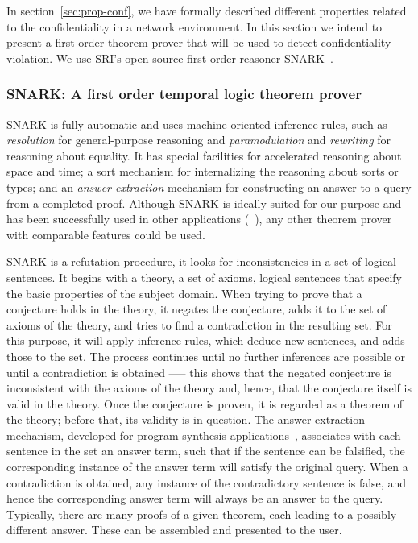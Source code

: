 \label{sec:proof-detects-violation}
In section~\ref{sec:prop-conf}, we have formally described different properties related to the confidentiality in a network environment.
In this section we intend to present a first-order theorem prover that will be used to detect confidentiality violation.
We use SRI's open-source first-order reasoner SNARK~\cite{snark-Stickel2000}.
\subsubsection{SNARK: A first order temporal logic theorem prover}
SNARK is fully automatic and uses machine-oriented inference rules, such as \textit{resolution} for general-purpose reasoning and \textit{paramodulation} and \textit{rewriting} for reasoning about equality.
It has special facilities
for accelerated reasoning about space and time; a sort mechanism for internalizing the reasoning about sorts or types; and an \textit{answer extraction} mechanism for constructing an answer to a query from a completed proof. 
Although SNARK is ideally suited for our purpose and has been successfully used in other applications (\eg~\cite{AICPub2006:2015}), any other theorem prover with comparable features could be used.

SNARK is a refutation procedure, \ie it looks for inconsistencies in a set of logical sentences. It begins with a theory, a set of axioms, \ie logical sentences that specify the basic properties of the subject domain. 
When trying to prove that a conjecture holds in the theory, it negates the conjecture, adds it to the set of axioms of the theory, and tries to find a contradiction in the resulting set. 
For this purpose, it will apply inference rules, which deduce new sentences, and adds those to the set. The process continues until no further inferences are possible or until a contradiction is obtained \-—-- this shows that the negated conjecture is inconsistent with the axioms of the theory and, hence, that the conjecture itself is valid in the theory. 
Once the conjecture is proven, it is regarded as a theorem of the theory; before that, its validity is in question.
The answer extraction mechanism, developed for program synthesis applications~\cite{Manna:1980:DAP:357084.357090}, associates with each sentence in the set an answer term, such that if the sentence can be falsified, the corresponding instance of the answer term will satisfy the original query. 
When a contradiction is obtained, any instance of the contradictory sentence is false, and hence the corresponding answer term will always  be an answer to the query. 
Typically, there are many proofs of a given theorem, each leading to a possibly different answer. 
These can be assembled and presented to the user.

